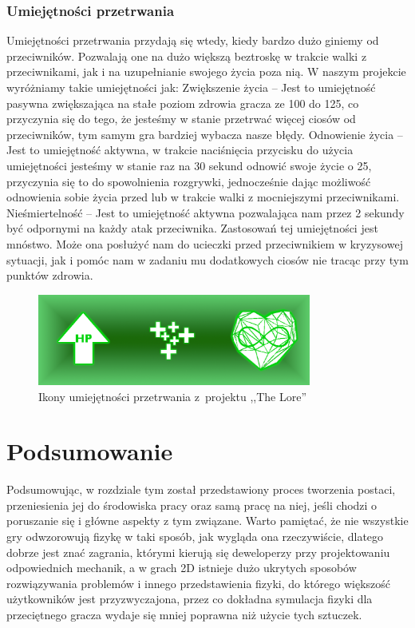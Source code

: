 \documentclass[oneside,polski,logo]{amuthesis}
\begin{document}
\subsubsection{Umiejętności przetrwania}
Umiejętności przetrwania przydają się wtedy, kiedy bardzo dużo giniemy od przeciwników. Pozwalają one na dużo większą beztroskę w trakcie walki z przeciwnikami, jak i na uzupełnianie swojego życia poza nią. W naszym projekcie wyróżniamy takie umiejętności jak:
Zwiększenie życia – Jest to umiejętność pasywna zwiększająca na stałe poziom zdrowia gracza ze 100 do 125, co przyczynia się do tego, że jesteśmy w stanie przetrwać więcej ciosów od przeciwników, tym samym gra bardziej wybacza nasze błędy.
Odnowienie życia – Jest to umiejętność aktywna, w trakcie naciśnięcia przycisku do użycia umiejętności jesteśmy w stanie raz na 30 sekund odnowić swoje życie o 25, przyczynia się to do spowolnienia rozgrywki, jednocześnie dając możliwość odnowienia sobie życia przed lub w trakcie walki z mocniejszymi przeciwnikami.
Nieśmiertelność – Jest to umiejętność aktywna pozwalająca nam przez 2 sekundy być odpornymi na każdy atak przeciwnika. Zastosowań tej umiejętności jest mnóstwo. Może ona posłużyć nam do ucieczki przed przeciwnikiem w kryzysowej sytuacji, jak i pomóc nam w zadaniu mu dodatkowych ciosów nie tracąc przy tym punktów zdrowia. 


\begin{figure}[h]
	\centering
	\includegraphics[width=9cm]{images/kozubal/patience.png}
	\caption{Ikony umiejętności przetrwania z~projektu ,,The Lore''}
\end{figure}

\section{Podsumowanie}
Podsumowując, w rozdziale tym został przedstawiony proces tworzenia postaci, przeniesienia jej do środowiska pracy oraz samą pracę na niej, jeśli chodzi o poruszanie się i główne aspekty z tym związane. Warto pamiętać, że nie wszystkie gry odwzorowują fizykę w taki sposób, jak wygląda ona rzeczywiście, dlatego dobrze jest znać zagrania, którymi kierują się deweloperzy przy projektowaniu odpowiednich mechanik, a w grach 2D istnieje dużo ukrytych sposobów rozwiązywania problemów i innego przedstawienia fizyki, do którego większość użytkowników jest przyzwyczajona, przez co dokładna symulacja fizyki dla przeciętnego gracza wydaje się mniej poprawna niż użycie tych sztuczek.
\end{document}
